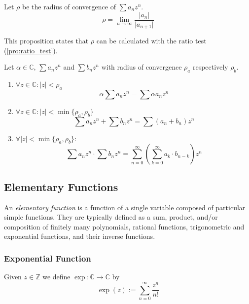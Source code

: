 \begin{proposition}\label{pro:conv_rad_ratio_test}
   Let \(\rho\) be the radius of convergence of \(\sum a_n z^n\).
   \[\rho = \lim_{n \to \infty} \frac{\lvert a_n\rvert}{\lvert a_{n+1}\rvert}\]
\end{proposition}
\begin{remark}
   This proposition states that \(\rho\) can be calculated with the ratio test (\ref{pro:ratio_test}).
\end{remark}

\begin{theorem}
   Let \(\alpha \in \mathbb{C}\), \(\sum a_n z^n\) and \(\sum b_n z^n\) with radius of convergence \(\rho_a\) respectively \(\rho_b\).
   \begin{enumerate}[label=\roman*, align=Center]
      \item \(\forall z \in \mathbb{C}: \lvert z\rvert < \rho_a\)
         \[\alpha \sum a_n z^n = \sum \alpha a_n z^n\]
      \item \(\forall z \in \mathbb{C}: \lvert z\rvert < \min\{\rho_a, \rho_b\}\)
         \[\sum a_n z^n + \sum b_n z^n = \sum (a_n + b_n)z^n\]
      \item \(\forall \lvert z\rvert < \min\{\rho_a, \rho_b\}:\)
         \[\sum a_n z^n \cdot \sum b_n z^n = \sum_{n=0}^\infty\left(\sum_{k=0}^\infty a_k \cdot b_{n-k}\right)z^n\]
   \end{enumerate}
\end{theorem}

\newpage

\subsection{Elementary Functions}
An \emph{elementary function} is a function of a single variable composed of particular simple functions.
They are typically defined as a sum, product, and/or composition of finitely many polynomials, rational functions, trigonometric and exponential functions, and their inverse functions.

\subsubsection{Exponential Function}
\begin{definition}
   Given \(z \in \mathbb{Z}\) we define \(\exp: \mathbb{C} \to \mathbb{C}\) by
   \[\exp(z) := \sum_{n = 0}^\infty \frac{z^n}{n!}\]
\end{definition}

